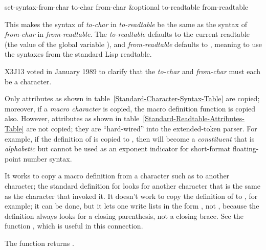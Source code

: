\begin{defun}[Function]
set-syntax-from-char to-char from-char &optional to-readtable from-readtable

This makes the syntax of \emph{to-char} in \emph{to-readtable} be the same as the
syntax of \emph{from-char} in \emph{from-readtable}.  The \emph{to-readtable}
defaults to the current readtable (the value of the global variable
), and \emph{from-readtable} defaults to {\false}, meaning
to use the syntaxes from the standard Lisp readtable.
\begin{new}
X3J13 voted in January 1989
to clarify that the \emph{to-char} and \emph{from-char}
must each be a character.
\end{new}

Only attributes as shown in
table~\ref{Standard-Character-Syntax-Table} are copied; moreover,
if a \emph{macro character} is copied, the macro definition function
is copied also.
However, attributes as shown
in table~\ref{Standard-Readtable-Attributes-Table} are not copied;
they are ``hard-wired'' into the extended-token parser.
For example, if the definition of  is copied to \cdf{*},
then \cdf{*} will become a \emph{constituent} that is
\emph{alphabetic} but cannot be used
as an exponent indicator for short-format floating-point number syntax.

It works to copy a macro definition from a character such as
 to another character; the standard definition for 
looks for another character that is the same as the character that
invoked it.  It doesn't work to copy the definition of \cd{(}
to \cd{{\Xlbrace}}, for example; it can be done, but it lets one write lists
in the form , not ,
because the definition
always looks for a closing parenthesis, not a closing brace.  See the function
, which is useful in this connection.

The  function returns .
\end{defun}

